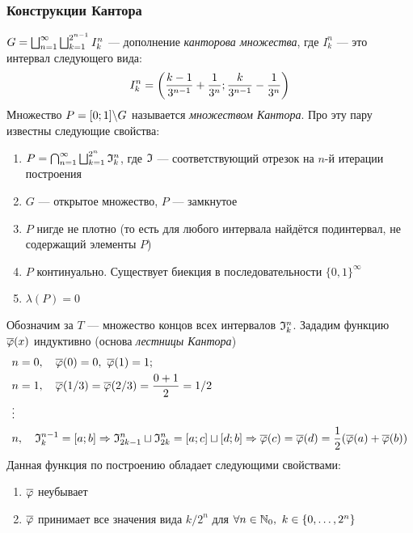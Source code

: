 \subsubsection*{Конструкции Кантора}

\begin{reminder}
	$G = \bigsqcup_{n = 1}^\infty \bigsqcup_{k = 1}^{2^{n - 1}} I_k^n$ --- дополнение \textit{канторова множества}, где $I_k^n$ --- это интервал следующего вида:
	\[
	I_k^n = \left(\frac{k - 1}{3^{n - 1}} + \frac{1}{3^n}; \frac{k}{3^{n - 1}} - \frac{1}{3^n}\right)
	\]
	Множество $P = [0; 1] \backslash G$ называется \textit{множеством Кантора}. Про эту пару известны следующие свойства:
	\begin{enumerate}
		\item $P = \bigcap_{n = 1}^\infty \bigsqcup_{k = 1}^{2^n} \mathfrak{I}_k^n$, где $\mathfrak{I}$ --- соответствующий отрезок на $n$-й итерации построения
		
		\item $G$ --- открытое множество, $P$ --- замкнутое
		
		\item $P$ нигде не плотно (то есть для любого интервала найдётся подинтервал, не содержащий элементы $P$)
		
		\item $P$ континуально. Существует биекция в последовательности $\{0, 1\}^\infty$
		
		\item $\lambda(P) = 0$
	\end{enumerate}
\end{reminder}

\begin{reminder}
	Обозначим за $T$ --- множество концов всех интервалов $\mathfrak{I}_k^n$. Зададим функцию $\overline{\varphi}(x)$ индуктивно (основа \textit{лестницы Кантора})
	\begin{align*}
		&{n = 0, \quad \overline{\varphi}(0) = 0,\ \overline{\varphi}(1) = 1;}
		\\
		&{n = 1, \quad \overline{\varphi}(1 / 3) = \overline{\varphi}(2 / 3) = \frac{0 + 1}{2} = 1 / 2}
		\\
		&{\vdots}
		\\
		&{n, \quad \mathfrak{I}_k^{n - 1} = [a; b] \Rightarrow \mathfrak{I}_{2k - 1}^n \sqcup \mathfrak{I}_{2k}^n = [a; c] \sqcup [d; b] \Rightarrow \overline{\varphi}(c) = \overline{\varphi}(d) = \frac{1}{2}(\overline{\varphi}(a) + \overline{\varphi}(b))}
	\end{align*}
	Данная функция по построению обладает следующими свойствами:
	\begin{enumerate}
		\item $\overline{\varphi}$ неубывает
		
		\item $\overline{\varphi}$ принимает все значения вида $k / 2^n$ для $\forall n \in \mathbb{N}_0,\ k \in \{0, \ldots, 2^n\}$
	\end{enumerate}
\end{reminder}

